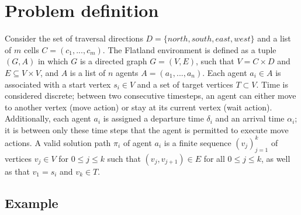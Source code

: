 
\section{Problem definition}\label{sec:problem_definition}
Consider the set of traversal directions $D = \{north, south, east, west\}$  and a list of $m$ cells $C = (c_1, ..., c_m)$. 
The Flatland environment is defined as a tuple $(G,A)$ in which $G$ is a directed graph $G = (V,E)$, such that $V = C \times D$ and $E \subseteq V \times V$, and $A$ is a list of $n$ agents $A = (a_1, ..., a_n)$.
Each agent $a_i \in A$ is associated with a start vertex $s_i \in V$ and a set of target vertices $T \subset V$.
Time is considered discrete; between two consecutive timesteps, an agent can either move to another vertex (move action) or stay at its current vertex (wait action).  
Additionally, each agent $a_i$ is assigned a departure time $\delta_i$ and an arrival time $\alpha_i$; it is between only these time steps that the agent is permitted to execute move actions.
A valid solution path $\pi_i$ of agent $a_i$ is a finite sequence $(v_j)_{j=1}^k$ of vertices $v_j \in V$ for $0 \leq j \leq k$ such that $(v_j,v_{j+1}) \in E$ for all $0 \leq j \leq k$, as well as that $v_1 = s_i$ and $v_k \in T$.

\subsection{Example}\label{sec:example}

